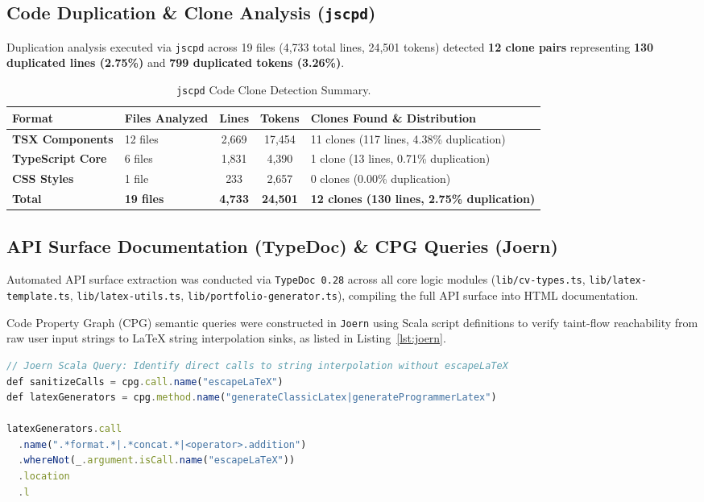 \documentclass[12pt,a4paper]{article}
\begin{document}
\subsection{Code Duplication \& Clone Analysis (\texttt{jscpd})}
Duplication analysis executed via \texttt{jscpd} across 19 files (4,733 total lines, 24,501 tokens) detected \textbf{12 clone pairs} representing \textbf{130 duplicated lines (2.75\%)} and \textbf{799 duplicated tokens (3.26\%)}.

\begin{table}[H]
\centering
\small
\begin{tabularx}{\textwidth}{l p{5.5cm} c c X}
\toprule
\textbf{Format} & \textbf{Files Analyzed} & \textbf{Lines} & \textbf{Tokens} & \textbf{Clones Found \& Distribution} \\
\midrule
\textbf{TSX Components} & 12 files & 2,669 & 17,454 & 11 clones (117 lines, 4.38\% duplication) \\
\textbf{TypeScript Core} & 6 files & 1,831 & 4,390 & 1 clone (13 lines, 0.71\% duplication) \\
\textbf{CSS Styles} & 1 file & 233 & 2,657 & 0 clones (0.00\% duplication) \\
\midrule
\textbf{Total} & \textbf{19 files} & \textbf{4,733} & \textbf{24,501} & \textbf{12 clones (130 lines, 2.75\% duplication)} \\
\bottomrule
\end{tabularx}
\caption{\texttt{jscpd} Code Clone Detection Summary.}
\label{tab:jscpd}
\end{table}

\subsection{API Surface Documentation (TypeDoc) \& CPG Queries (Joern)}
Automated API surface extraction was conducted via \texttt{TypeDoc 0.28} across all core logic modules (\texttt{lib/cv-types.ts}, \texttt{lib/latex-template.ts}, \texttt{lib/latex-utils.ts}, \texttt{lib/portfolio-generator.ts}), compiling the full API surface into HTML documentation.

Code Property Graph (CPG) semantic queries were constructed in \texttt{Joern} using Scala script definitions to verify taint-flow reachability from raw user input strings to LaTeX string interpolation sinks, as listed in Listing~\ref{lst:joern}.

\begin{lstlisting}[language=TypeScript, caption={Joern CPG Query for LaTeX Sanitization Taint Flow}, label={lst:joern}]
// Joern Scala Query: Identify direct calls to string interpolation without escapeLaTeX
def sanitizeCalls = cpg.call.name("escapeLaTeX")
def latexGenerators = cpg.method.name("generateClassicLatex|generateProgrammerLatex")

latexGenerators.call
  .name(".*format.*|.*concat.*|<operator>.addition")
  .whereNot(_.argument.isCall.name("escapeLaTeX"))
  .location
  .l
\end{lstlisting}
\end{document}
